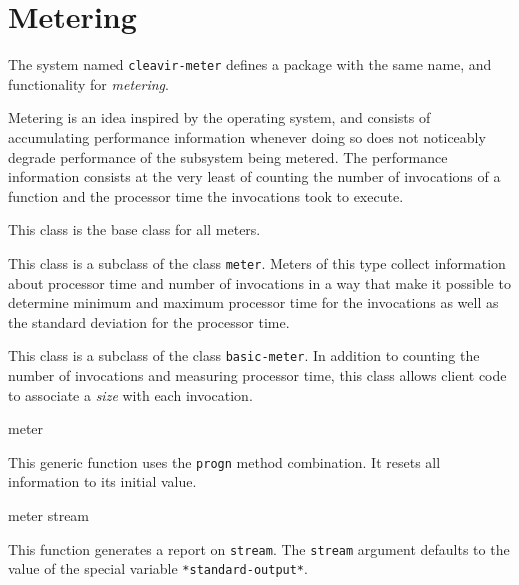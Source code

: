\chapter{Metering}

The system named \texttt{cleavir-meter} defines a package with the
same name, and functionality for \emph{metering}. 

Metering is an idea inspired by the \multics{} operating system, and
consists of accumulating performance information whenever doing so
does not noticeably degrade performance of the subsystem being
metered.  The performance information consists at the very least of
counting the number of invocations of a function and the processor
time the invocations took to execute.


This class is the base class for all meters.


This class is a subclass of the class \texttt{meter}.  Meters of this
type collect information about processor time and number of
invocations in a way that make it possible to determine minimum and
maximum processor time for the invocations as well as the standard
deviation for the processor time.


This class is a subclass of the class \texttt{basic-meter}.  In
addition to counting the number of invocations and measuring processor
time, this class allows client code to associate a \emph{size} with
each invocation.

 {meter}

This generic function uses the \texttt{progn} method combination.  It
resets all information to its initial value.

 {meter \optional{} stream}

This function generates a report on \texttt{stream}.
The \texttt{stream} argument defaults to the value of the special
variable \texttt{*standard-output*}.

